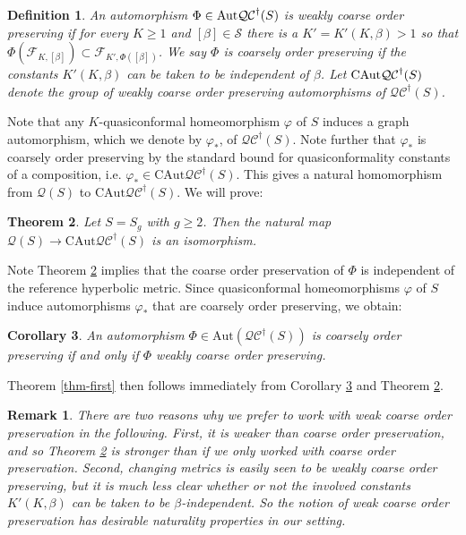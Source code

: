 \documentclass[12pt,a4paper]{amsart}
\theoremstyle{definition}
\theoremstyle{plain}
\newtheorem{theorem}{Theorem}[section]
\newtheorem{corollary}[theorem]{Corollary}
\newtheorem{definition}[theorem]{Definition}
\newtheorem{remark}{Remark}
\numberwithin{equation}{section}
\newcommand{\qcg}{\mathcal{QC}^{\dagger}}
\begin{document}
\begin{definition}\label{def-coarse-pres}
An automorphism $\Phi \in {\rm{Aut}}\qcg(S)$ is {\rm{weakly coarse order preserving}} if for every $K \geq 1$ and $[\beta] \in \mathscr{S}$ there is a $K' = K'(K,\beta) > 1$ so that $\Phi\left(\mathcal{F}_{K, [\beta]}\right) \subset \mathcal{F}_{K', \Phi([\beta])}$.
We say $\Phi$ is {\rm{coarsely order preserving}} if the constants $K'(K,\beta)$ can be taken to be independent of $\beta$.
    Let ${\rm{CAut}}\qcg(S)$ denote the group of weakly coarse order preserving automorphisms of $\qcg(S)$.
\end{definition}

Note that any $K$-quasiconformal homeomorphism $\varphi$ of $S$ induces a graph automorphism, which we denote by $\varphi_*$, of $\mathcal{QC}^\dagger(S)$. 
Note further that $\varphi_*$ is coarsely order preserving by the standard bound for quasiconformality constants of a composition, i.e. $\varphi_* \in \mathrm{CAut}\mathcal{QC}^\dagger(S)$.
This gives a natural homomorphism from $\mathcal{Q}(S)$ to $\mathrm{CAut}\mathcal{QC}^\dagger(S)$.
We will prove:

\begin{theorem}\label{thm-first-precise}
    Let $S = S_g$ with $g \geq 2$. Then the natural map $\mathcal{Q}(S) \to \mathrm{CAut}\mathcal{QC}^\dagger(S)$ is an isomorphism.
\end{theorem}

Note Theorem \ref{thm-first-precise} implies that the coarse order preservation of $\Phi$ is independent of the reference hyperbolic metric.
Since quasiconformal homeomorphisms $\varphi$ of $S$ induce automorphisms $\varphi_*$ that are coarsely order preserving, we obtain:

\begin{corollary}\label{cor-weakly-coarse-is-coarse}
    An automorphism $\Phi \in \mathrm{Aut}(\qcg(S))$ is coarsely order preserving if and only if $\Phi$ weakly coarse order preserving. 
\end{corollary}

Theorem \ref{thm-first} then follows immediately from Corollary \ref{cor-weakly-coarse-is-coarse} and Theorem \ref{thm-first-precise}.

\begin{remark}\label{rmk-coarse-order}
    There are two reasons why we prefer to work with weak coarse order preservation in the following.
    First, it is weaker than coarse order preservation, and so Theorem \ref{thm-first-precise} is stronger than if we only worked with coarse order preservation.
    Second, changing metrics is easily seen to be weakly coarse order preserving, but it is much less clear whether or not the involved constants $K'(K,\beta)$ can be taken to be $\beta$-independent.
    So the notion of weak coarse order preservation has desirable naturality properties in our setting.
\end{remark}
\end{document}
